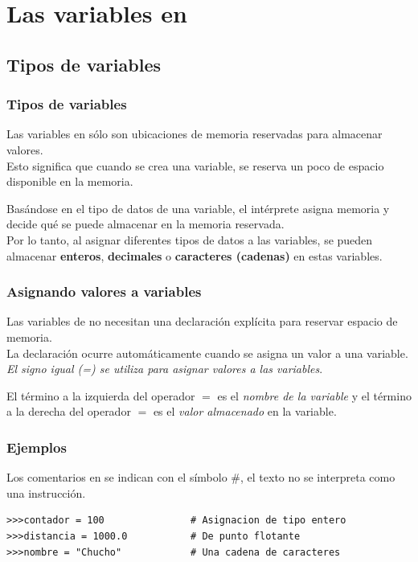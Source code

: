 {\section{Las variables en \python}
\subsection{Tipos de variables}
\begin{frame}
\frametitle{Tipos de variables}
Las variables en \python{} sólo son ubicaciones de memoria reservadas para almacenar valores.
\\
\bigskip
Esto significa que cuando se crea una variable, se reserva un poco de espacio disponible en la memoria.
\end{frame}
\begin{frame}
Basándose en el tipo de datos de una variable, el intérprete asigna memoria y decide qué se puede almacenar en la memoria reservada.
\\
\bigskip
Por lo tanto, al asignar diferentes tipos de datos a las variables, se pueden almacenar \textbf{enteros}, \textbf{decimales} o \textbf{caracteres (cadenas)} en estas variables.
\end{frame}
\begin{frame}
\frametitle{Asignando valores a variables}
Las variables de \python{} no necesitan una declaración explícita para reservar espacio de memoria.
\\
\bigskip
La declaración ocurre automáticamente cuando se asigna un valor a una variable. \emph{El signo igual (=) se utiliza para asignar valores a las variables}.
\end{frame}
\begin{frame}
El término a la izquierda del operador $=$ es el \emph{nombre de la variable} y el término a la derecha del operador $=$ es el \emph{valor almacenado} en la variable.
\end{frame}
\begin{frame}[fragile]
\frametitle{Ejemplos}
Los comentarios en \python{} se indican con el símbolo $\#$, el texto no se interpreta como una instrucción.
\begin{exampleblock}{}
\fontsize{10}{10}\selectfont
\begin{verbatim}
>>>contador = 100				# Asignacion de tipo entero
>>>distancia = 1000.0			# De punto flotante
>>>nombre = "Chucho"			# Una cadena de caracteres


\end{verbatim}
\end{exampleblock}
\end{frame}}
